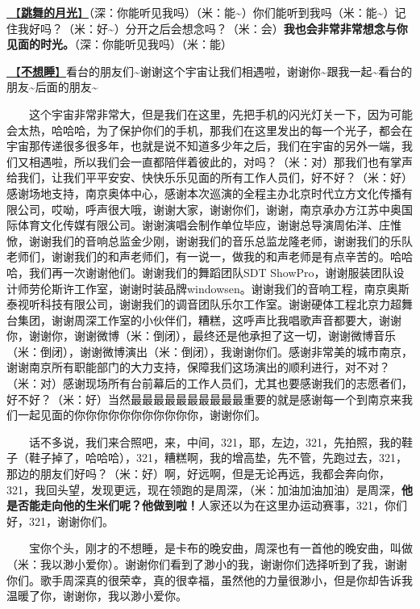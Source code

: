 \documentclass[]{ctexbook}
\begin{document}
\hyperref[dancing-moonshine]{🎵【\textbf{跳舞的月光}】}（深：你能听见我吗）（米：能\textasciitilde）你们能听到我吗（米：能\textasciitilde）记住我好吗？（米：好\textasciitilde）分开之后会想念吗？（米：会）\textbf{我也会非常非常想念与你见面的时光。}（深：你能听见我吗）（米：能）

\hyperref[donot-want-to-sleep]{🎵【\textbf{不想睡}】}看台的朋友们\textasciitilde 谢谢这个宇宙让我们相遇啦，谢谢你\textasciitilde 跟我一起\textasciitilde 看台的朋友\textasciitilde 后面的朋友\textasciitilde{}

  这个宇宙非常非常大，但是我们在这里，先把手机的闪光灯关一下，因为可能会太热，哈哈哈，为了保护你们的手机，那我们在这里发出的每一个光子，都会在宇宙那传递很多很多年，也就是说不知道多少年之后，我们在宇宙的另外一端，我们又相遇啦，所以我们会一直都陪伴着彼此的，对吗？（米：对）那我们也有掌声给我们，让我们平平安安、快快乐乐见面的所有工作人员们，好不好？（米：好）感谢场地支持，南京奥体中心，感谢本次巡演的全程主办北京时代立方文化传播有限公司，哎呦，呼声很大哦，谢谢大家，谢谢你们，谢谢，南京承办方江苏中奥国际体育文化传媒有限公司。谢谢演唱会制作单位毕应，谢谢总导演周佑洋、庄惟惞，谢谢我们的音响总监金少刚，谢谢我们的音乐总监龙隆老师，谢谢我们的乐队老师们，谢谢我们的和声老师们，有一说一，做我的和声老师是有点辛苦的。哈哈哈，我们再一次谢谢他们。谢谢我们的舞蹈团队SDT ShowPro，谢谢服装团队设计师劳伦斯许工作室，谢谢时装品牌windowsen。谢谢我们的音响工程，南京奥斯泰视听科技有限公司，谢谢我们的调音团队乐尔工作室。谢谢硬体工程北京力超舞台集团，谢谢周深工作室的小伙伴们，糟糕，这呼声比我唱歌声音都要大，谢谢你，谢谢你，谢谢微博（米：倒闭），最终还是他承担了这一切，谢谢微博音乐（米：倒闭），谢谢微博演出（米：倒闭），我谢谢你们。感谢非常美的城市南京，谢谢南京所有职能部门的大力支持，保障我们这场演出的顺利进行，对不对？（米：对）感谢现场所有台前幕后的工作人员们，尤其也要感谢我们的志愿者们，好不好？（米：好）当然最最最最最最最最最最重要的就是感谢每一个到南京来我们一起见面的你你你你你你你你你你你，谢谢你们。

  话不多说，我们来合照吧，来，中间，321，耶，左边，321，先拍照，我的鞋子（鞋子掉了，哈哈哈），321，糟糕啊，我的增高垫，先不管，先跑过去，321，那边的朋友们好吗？（米：好）啊，好远啊，但是无论再远，我都会奔向你，321，我回头望，发现更远，现在领跑的是周深，（米：加油加油加油）是周深，\textbf{他是否能走向他的生米们呢？他做到啦！}人家还以为在这里办运动赛事，321，你们好，321，谢谢你们。

  宝你个头，刚才的不想睡，是卡布的晚安曲，周深也有一首他的晚安曲，叫做（米：我以渺小爱你）。谢谢你们看到了渺小的我，谢谢你们选择听到了我，谢谢你们。歌手周深真的很荣幸，真的很幸福，虽然他的力量很渺小，但是你却告诉我温暖了你，谢谢你，我以渺小爱你。
\end{document}
